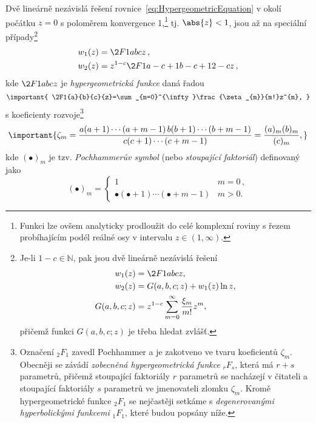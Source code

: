 Dvě lineárně nezávislá řešení rovnice~\eqref{eq:HypergeometricEquation} v okolí počátku $z=0$ s poloměrem konvergence 1,\footnote{
    Funkci lze ovšem analyticky prodloužit do celé komplexní roviny 
    s řezem probíhajícím podél reálné osy v intervalu $z\in(1,\infty)$.
} tj. $\abs{z}<1$, jsou až na speciální případy\footnote{
    Je-li $1-c\in\mathbb{N}$, pak jsou dvě lineárně nezávislá řešení
    \begin{subequations}
        \begin{align}
            w_{1}(z)&=\2F1{a}{b}{c}{z},\\
            w_{2}(z)&=G(a,b,c;z)+w_{1}(z)\ln{z},\\
            G(a,b,c;z)&=z^{1-c}\sum_{m=0}^{\infty}\frac{\xi_{m}}{m!}z^{m},
        \end{align}    
    \end{subequations}
    přičemž funkci $G(a,b,c;z)$ je třeba hledat zvlášť.
}
\begin{subequations}
    \begin{align}
        w_{1}(z)&=\2F1{a}{b}{c}{z}\,,\\
        w_{2}(z)&=z^{1-c}\2F1{a-c+1}{b-c+1}{2-c}{z}\,,
    \end{align}    
\end{subequations}
kde $\2F1{a}{b}{c}{z}$ je \emph{hypergeometrická funkce} daná řadou
\begin{equation}
    \important{
        \2F1{a}{b}{c}{z}=\sum_{m=0}^{\infty}\frac{\zeta_{m}}{m!}z^{m},
    }
\end{equation}
s koeficienty rozvoje\footnote{
    Označení ${}_{2}F_{1}$ zavedl Pochhammer a je zakotveno ve tvaru koeficientů $\zeta_{m}$.
    Obecněji se závádí \emph{zobecněná hypergeometrická funkce} ${}_{r}F_{s}$, 
    která má $r+s$ parametrů, přičemž stoupající faktoriály $r$ parametrů se nacházejí 
    v čitateli a stoupající faktoriály $s$ parametrů ve jmenovateli zlomku $\zeta_{m}$.
    Kromě hypergeometrické funkce ${}_{2}F_{1}$ se nejčastěji setkáme s 
    \emph{degenerovanými hyperbolickými funkcemi}	${}_{1}F_{1}$, které budou popsány níže.
}
\begin{equation}
    \important{
        \zeta_{m}
            =\frac{a(a+1)\dotsb(a+m-1)\,b(b+1)\dotsb(b+m-1)}{c(c+1)\dotsb(c+m-1)}
            =\frac{(a)_{m}(b)_{m}}{(c)_{m}},
    }
\end{equation}
kde $(\bullet)_{m}$ je tzv. \emph{Pochhammerův symbol} (nebo \emph{stoupající faktoriál})
definovaný jako
\begin{equation}
    (\bullet)_{m}=\left\{\begin{array}{ll}
        1 & m=0\,, \\ \bullet(\bullet+1)\dotsb(\bullet+m-1) & m>0.
        \end{array}\right.
\end{equation}
